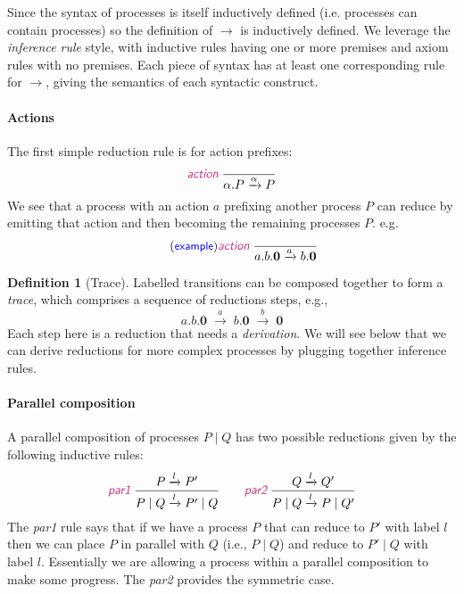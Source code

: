 \documentclass{article}
\newcommand{\exampleLabel}{\tag{\small{\textcolor{blue}{\textsf{example}}}}}
\theoremstyle{definition}
\newtheorem{definition}{Definition}
\newcommand{\trule}[1]{\textcolor{labelColor}{\textit{\textsf{#1}}}\;}
\begin{document}
Since the syntax of processes is itself inductively defined (i.e.
processes can contain processes) so the definition of $\rightarrow$ is
inductively defined. We leverage the \emph{inference rule} style, with
inductive rules having one or more premises and axiom rules with no
premises. Each piece of syntax has at least one corresponding rule for
$\rightarrow$, giving the semantics of each syntactic construct.

\paragraph{Actions}

The first simple reduction rule is for action prefixes:
%
\begin{align*}
  \trule{action}\dfrac{}{\alpha.P \xrightarrow{\alpha} P}
\end{align*}
%
We see that a process with an action $a$ prefixing another process $P$ can reduce by
emitting that action and then becoming the remaining processes $P$.
e.g.
%
\begin{align*}
  \exampleLabel{}
  \trule{action}\dfrac{}{a.b.\mathbf{0} \xrightarrow{a} b.\mathbf{0}}
\end{align*}
%
\begin{definition}[Trace]
  Labelled transitions can be composed together to form a
  \emph{trace},
  which comprises a sequence of reductions steps, e.g.,
  \begin{equation*}
    a.b.\mathbf{0} \; \xrightarrow{a} \; b.\mathbf{0} \; \xrightarrow{b} \;\mathbf{0}
  \end{equation*}
  Each step here is a reduction that needs a \emph{derivation}. We
  will see below that we can derive reductions for more complex
  processes by plugging together inference rules.
\end{definition}

\paragraph{Parallel composition}
A parallel composition of processes $P \mid Q$ has two possible
reductions given by the following inductive rules:
%
\begin{align*}
  \trule{par1}{\dfrac{P \xrightarrow{l} P'}{P \mid Q \xrightarrow{l} P' \mid Q}}
\qquad
\trule{par2}{\dfrac{Q \xrightarrow{l} Q'}{P \mid Q \xrightarrow{l} P \mid Q'}}
\end{align*}
%
The \trule{par1} rule says that if we have a process $P$ that
can reduce to $P'$ with label $l$ then we can place $P$ in parallel
with $Q$ (i.e., $P \mid Q$) and reduce to $P' \mid Q$ with label $l$.
Essentially we are allowing a process within a parallel composition
to make some progress. The \trule{par2} provides the symmetric case.
\end{document}
